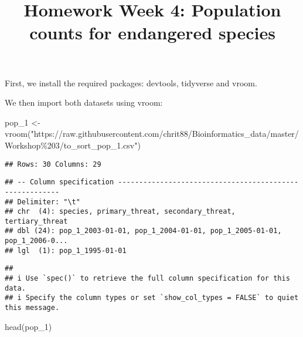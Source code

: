 \documentclass[
]{article}
\title{Homework Week 4: Population counts for endangered species}
\author{}
\date{\vspace{-2.5em}}
\newenvironment{Shaded}{\begin{snugshade}}{\end{snugshade}}
\newcommand{\FunctionTok}[1]{\textcolor[rgb]{0.00,0.00,0.00}{#1}}
\newcommand{\NormalTok}[1]{#1}
\newcommand{\OtherTok}[1]{\textcolor[rgb]{0.56,0.35,0.01}{#1}}
\newcommand{\StringTok}[1]{\textcolor[rgb]{0.31,0.60,0.02}{#1}}
\begin{document}
\maketitle

First, we install the required packages: devtools, tidyverse and vroom.

We then import both datasets using vroom:

\begin{Shaded}
\begin{Highlighting}[]
\NormalTok{pop\_1 }\OtherTok{\textless{}{-}} \FunctionTok{vroom}\NormalTok{(}\StringTok{"https://raw.githubusercontent.com/chrit88/Bioinformatics\_data/master/Workshop\%203/to\_sort\_pop\_1.csv"}\NormalTok{)}
\end{Highlighting}
\end{Shaded}

\begin{verbatim}
## Rows: 30 Columns: 29
\end{verbatim}

\begin{verbatim}
## -- Column specification --------------------------------------------------------
## Delimiter: "\t"
## chr  (4): species, primary_threat, secondary_threat, tertiary_threat
## dbl (24): pop_1_2003-01-01, pop_1_2004-01-01, pop_1_2005-01-01, pop_1_2006-0...
## lgl  (1): pop_1_1995-01-01
\end{verbatim}

\begin{verbatim}
## 
## i Use `spec()` to retrieve the full column specification for this data.
## i Specify the column types or set `show_col_types = FALSE` to quiet this message.
\end{verbatim}

\begin{Shaded}
\begin{Highlighting}[]
\FunctionTok{head}\NormalTok{(pop\_1)}
\end{Highlighting}
\end{Shaded}
\end{document}
